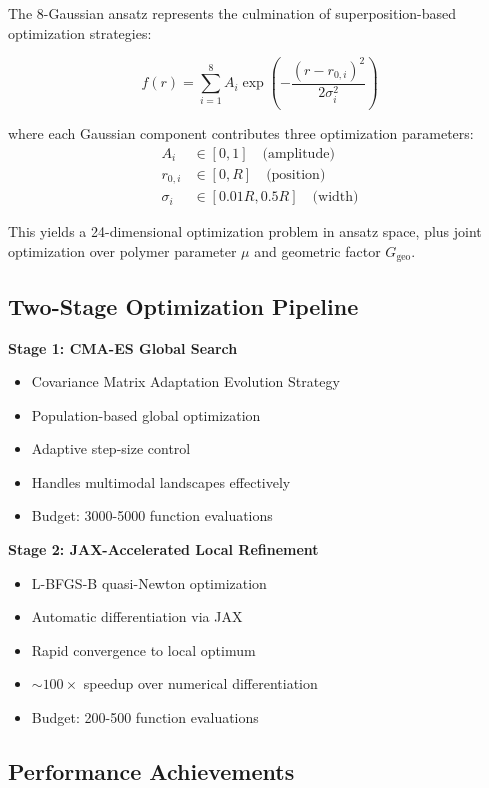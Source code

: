 \documentclass[11pt,a4paper]{article}
\begin{document}
The 8-Gaussian ansatz represents the culmination of superposition-based optimization strategies:

\begin{equation}
f(r) = \sum_{i=1}^{8} A_i \exp\left(-\frac{(r - r_{0,i})^2}{2\sigma_i^2}\right)
\end{equation}

where each Gaussian component contributes three optimization parameters:
\begin{align}
A_i &\in [0, 1] \quad \text{(amplitude)} \\
r_{0,i} &\in [0, R] \quad \text{(position)} \\
\sigma_i &\in [0.01R, 0.5R] \quad \text{(width)}
\end{align}

This yields a 24-dimensional optimization problem in ansatz space, plus joint optimization over polymer parameter $\mu$ and geometric factor $G_{\text{geo}}$.

\subsection{Two-Stage Optimization Pipeline}

\textbf{Stage 1: CMA-ES Global Search}
\begin{itemize}
\item Covariance Matrix Adaptation Evolution Strategy
\item Population-based global optimization
\item Adaptive step-size control
\item Handles multimodal landscapes effectively
\item Budget: 3000-5000 function evaluations
\end{itemize}

\textbf{Stage 2: JAX-Accelerated Local Refinement}
\begin{itemize}
\item L-BFGS-B quasi-Newton optimization
\item Automatic differentiation via JAX
\item Rapid convergence to local optimum
\item $\sim 100\times$ speedup over numerical differentiation
\item Budget: 200-500 function evaluations
\end{itemize}

\subsection{Performance Achievements}
\end{document}
